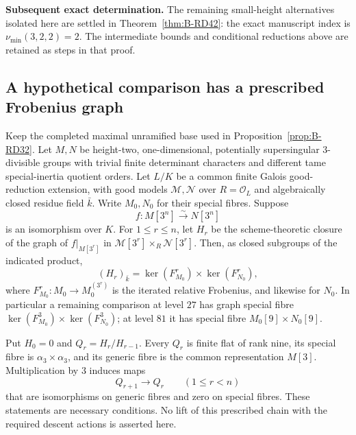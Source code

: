 \par\smallskip\noindent\textbf{Subsequent exact determination.}
The remaining small-height alternatives isolated here are settled in
Theorem~\ref{thm:B-RD42}: the exact manuscript index is
$\nu_{\min}(3,2,2)=2$. The intermediate bounds and conditional
reductions above are retained as steps in that proof.


\subsection{A hypothetical comparison has a prescribed Frobenius graph}

\begin{proposition}
\label{prop:B-RD33}
Keep the completed maximal unramified base used in
Proposition~\ref{prop:B-RD32}. Let $M,N$ be height-two,
one-dimensional, potentially supersingular $3$-divisible groups
with trivial finite determinant characters and different tame
special-inertia quotient orders. Let $L/K$ be a common finite
Galois good-reduction extension, with good models
$\mathcal M,\mathcal N$ over $R=\mathcal O_L$ and algebraically
closed residue field $\bar k$. Write $M_0,N_0$ for their special
fibres. Suppose
\[
             f:M[3^n]\xrightarrow{\sim}N[3^n]
                                                        \tag{B-RD33.1}
\]
is an isomorphism over $K$.
For $1\le r\le n$, let $H_r$ be the scheme-theoretic closure of
the graph of $f|_{M[3^r]}$ in
$\mathcal M[3^r]\times_R\mathcal N[3^r]$.
Then, as closed subgroups of the indicated product,
\[
 (H_r)_{\bar k}
       =\ker(F_{M_0}^{r})\times\ker(F_{N_0}^{r}),
                                                        \tag{B-RD33.2}
\]
where $F_{M_0}^{r}:M_0\to M_0^{(3^r)}$ is the iterated
relative Frobenius, and likewise for $N_0$.
In particular a remaining comparison at level $27$ has graph
special fibre $\ker(F_{M_0}^{3})\times\ker(F_{N_0}^{3})$;
at level $81$ it has special fibre $M_0[9]\times N_0[9]$.

Put $H_0=0$ and $Q_r=H_r/H_{r-1}$. Every $Q_r$ is finite flat
of rank nine, its special fibre is $\alpha_3\times\alpha_3$,
and its generic fibre is the common representation $M[3]$.
Multiplication by $3$ induces maps
\[
                    Q_{r+1}\longrightarrow Q_r
                      \qquad(1\le r<n)
                                                        \tag{B-RD33.3}
\]
that are isomorphisms on generic fibres and zero on special
fibres. These statements are necessary conditions. No lift
of this prescribed chain with the required descent actions
is asserted here.
\end{proposition}
